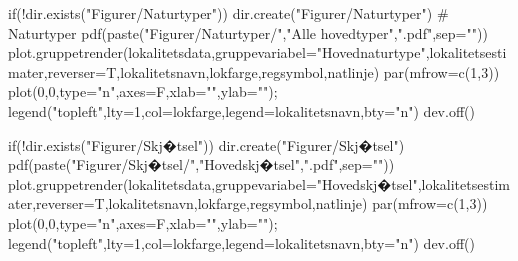 \documentclass[
  letterpaper,
  DIV=11,
  numbers=noendperiod]{scrreport}
\newenvironment{Shaded}{\begin{snugshade}}{\end{snugshade}}
\newcommand{\AttributeTok}[1]{\textcolor[rgb]{0.40,0.45,0.13}{#1}}
\newcommand{\CommentTok}[1]{\textcolor[rgb]{0.37,0.37,0.37}{#1}}
\newcommand{\ControlFlowTok}[1]{\textcolor[rgb]{0.00,0.23,0.31}{#1}}
\newcommand{\DecValTok}[1]{\textcolor[rgb]{0.68,0.00,0.00}{#1}}
\newcommand{\FunctionTok}[1]{\textcolor[rgb]{0.28,0.35,0.67}{#1}}
\newcommand{\NormalTok}[1]{\textcolor[rgb]{0.00,0.23,0.31}{#1}}
\newcommand{\SpecialCharTok}[1]{\textcolor[rgb]{0.37,0.37,0.37}{#1}}
\newcommand{\StringTok}[1]{\textcolor[rgb]{0.13,0.47,0.30}{#1}}
\begin{document}
\begin{Shaded}
\begin{Highlighting}[]
\ControlFlowTok{if}\NormalTok{(}\SpecialCharTok{!}\FunctionTok{dir.exists}\NormalTok{(}\StringTok{"Figurer/Naturtyper"}\NormalTok{)) }\FunctionTok{dir.create}\NormalTok{(}\StringTok{"Figurer/Naturtyper"}\NormalTok{)}
\CommentTok{\# Naturtyper}
\FunctionTok{pdf}\NormalTok{(}\FunctionTok{paste}\NormalTok{(}\StringTok{"Figurer/Naturtyper/"}\NormalTok{,}\StringTok{"Alle hovedtyper"}\NormalTok{,}\StringTok{".pdf"}\NormalTok{,}\AttributeTok{sep=}\StringTok{""}\NormalTok{))}
\FunctionTok{plot.gruppetrender}\NormalTok{(lokalitetsdata,}\AttributeTok{gruppevariabel=}\StringTok{"Hovednaturtype"}\NormalTok{,lokalitetsestimater,}\AttributeTok{reverser=}\NormalTok{T,lokalitetsnavn,lokfarge,regsymbol,natlinje)}
\FunctionTok{par}\NormalTok{(}\AttributeTok{mfrow=}\FunctionTok{c}\NormalTok{(}\DecValTok{1}\NormalTok{,}\DecValTok{3}\NormalTok{))}
\FunctionTok{plot}\NormalTok{(}\DecValTok{0}\NormalTok{,}\DecValTok{0}\NormalTok{,}\AttributeTok{type=}\StringTok{"n"}\NormalTok{,}\AttributeTok{axes=}\NormalTok{F,}\AttributeTok{xlab=}\StringTok{""}\NormalTok{,}\AttributeTok{ylab=}\StringTok{""}\NormalTok{); }\FunctionTok{legend}\NormalTok{(}\StringTok{"topleft"}\NormalTok{,}\AttributeTok{lty=}\DecValTok{1}\NormalTok{,}\AttributeTok{col=}\NormalTok{lokfarge,}\AttributeTok{legend=}\NormalTok{lokalitetsnavn,}\AttributeTok{bty=}\StringTok{"n"}\NormalTok{)}
\FunctionTok{dev.off}\NormalTok{()}

\ControlFlowTok{if}\NormalTok{(}\SpecialCharTok{!}\FunctionTok{dir.exists}\NormalTok{(}\StringTok{"Figurer/Skj�tsel"}\NormalTok{)) }\FunctionTok{dir.create}\NormalTok{(}\StringTok{"Figurer/Skj�tsel"}\NormalTok{)}
\FunctionTok{pdf}\NormalTok{(}\FunctionTok{paste}\NormalTok{(}\StringTok{"Figurer/Skj�tsel/"}\NormalTok{,}\StringTok{"Hovedskj�tsel"}\NormalTok{,}\StringTok{".pdf"}\NormalTok{,}\AttributeTok{sep=}\StringTok{""}\NormalTok{))}
\FunctionTok{plot.gruppetrender}\NormalTok{(lokalitetsdata,}\AttributeTok{gruppevariabel=}\StringTok{"Hovedskj�tsel"}\NormalTok{,lokalitetsestimater,}\AttributeTok{reverser=}\NormalTok{T,lokalitetsnavn,lokfarge,regsymbol,natlinje)}
\FunctionTok{par}\NormalTok{(}\AttributeTok{mfrow=}\FunctionTok{c}\NormalTok{(}\DecValTok{1}\NormalTok{,}\DecValTok{3}\NormalTok{))}
\FunctionTok{plot}\NormalTok{(}\DecValTok{0}\NormalTok{,}\DecValTok{0}\NormalTok{,}\AttributeTok{type=}\StringTok{"n"}\NormalTok{,}\AttributeTok{axes=}\NormalTok{F,}\AttributeTok{xlab=}\StringTok{""}\NormalTok{,}\AttributeTok{ylab=}\StringTok{""}\NormalTok{); }\FunctionTok{legend}\NormalTok{(}\StringTok{"topleft"}\NormalTok{,}\AttributeTok{lty=}\DecValTok{1}\NormalTok{,}\AttributeTok{col=}\NormalTok{lokfarge,}\AttributeTok{legend=}\NormalTok{lokalitetsnavn,}\AttributeTok{bty=}\StringTok{"n"}\NormalTok{)}
\FunctionTok{dev.off}\NormalTok{()}


\end{Highlighting}
\end{Shaded}
\end{document}
